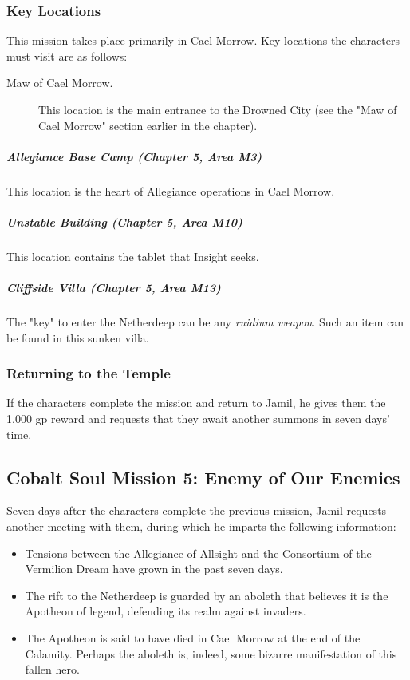 \documentclass[10pt,a4paper,twoside,bg=print,twocolumn,openany,nodeprecatedcode]{dndbook}
\begin{document}
\subsubsection{Key Locations}
This mission takes place primarily in Cael Morrow. Key locations the characters must visit are as follows:


\begin{description}
\item[Maw of Cael Morrow.]
This location is the main entrance to the Drowned City (see the "Maw of Cael Morrow" section earlier in the chapter).
\end{description}

\subparagraph{Allegiance Base Camp (Chapter 5, Area M3)}
This location is the heart of Allegiance operations in Cael Morrow.

\subparagraph{Unstable Building (Chapter 5, Area M10)}
This location contains the tablet that Insight seeks.

\subparagraph{Cliffside Villa (Chapter 5, Area M13)}
The "key" to enter the Netherdeep can be any \textit{ruidium weapon}. Such an item can be found in this sunken villa.

\subsubsection{Returning to the Temple}
If the characters complete the mission and return to Jamil, he gives them the 1,000 gp reward and requests that they await another summons in seven days' time.

\subsection{Cobalt Soul Mission 5: Enemy of Our Enemies}
Seven days after the characters complete the previous mission, Jamil requests another meeting with them, during which he imparts the following information:


\begin{itemize}
\item Tensions between the Allegiance of Allsight and the Consortium of the Vermilion Dream have grown in the past seven days.
\item The rift to the Netherdeep is guarded by an aboleth that believes it is the Apotheon of legend, defending its realm against invaders.
\item The Apotheon is said to have died in Cael Morrow at the end of the Calamity. Perhaps the aboleth is, indeed, some bizarre manifestation of this fallen hero.
\end{itemize}
\end{document}
